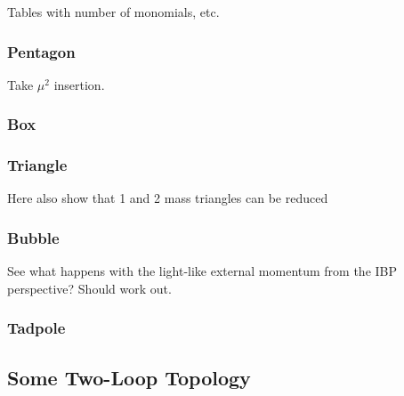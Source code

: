 Tables with number of monomials, etc.


\subsubsection{Pentagon}

Take $\mu^2$ insertion.

\subsubsection{Box}

\subsubsection{Triangle}

Here also show that 1 and 2 mass triangles can be reduced

\subsubsection{Bubble}

See what happens with the light-like external momentum from the IBP perspective?
Should work out.

\subsubsection{Tadpole}

\subsection{Some Two-Loop Topology}


